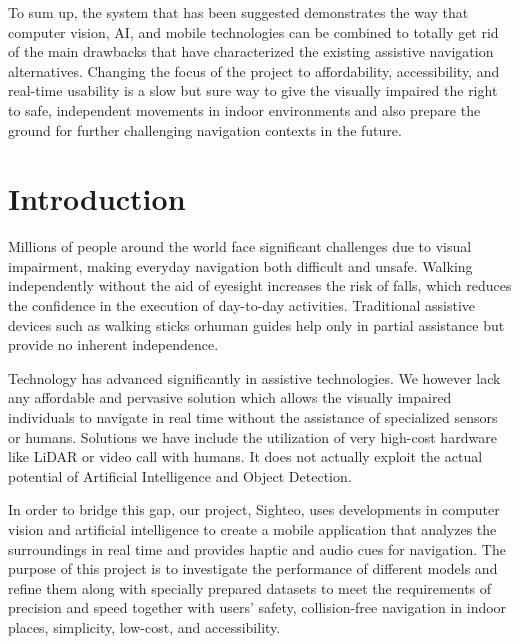 \documentclass{FastFyp}
\begin{document}
To sum up, the system that has been suggested demonstrates the way that computer vision, AI, and mobile technologies can be combined to totally get rid of the main drawbacks that have characterized the existing assistive navigation alternatives. Changing the focus of the project to affordability, accessibility, and real-time usability is a slow but sure way to give the visually impaired the right to safe, independent movements in indoor environments and also prepare the ground for further challenging navigation contexts in the future.


\pagebreak


\pagestyle{fancy} %
\tableofcontents

\pagebreak
\listoffigures	%
\pagebreak
\listoftables %

\mainmatter


\chapter{Introduction}
Millions of people around the world face significant challenges due to visual impairment, making everyday navigation both difficult and unsafe. Walking independently without the aid of eyesight increases the risk of falls, which reduces the confidence in the execution of day-to-day activities. Traditional assistive devices such as walking sticks orhuman guides help only in partial assistance but provide no inherent independence.  

Technology has advanced significantly in assistive technologies. We however lack any affordable and pervasive solution which allows the visually impaired individuals to navigate in real time without the assistance of specialized sensors or humans. Solutions we have include the utilization of very high-cost hardware like LiDAR or video call with humans. It does not actually exploit the actual potential of Artificial Intelligence and Object Detection.  

In order to bridge this gap, our project, Sighteo, uses developments in computer vision and artificial intelligence to create a mobile application that analyzes the surroundings in real time and provides haptic and audio cues for navigation. The purpose of this project is to investigate the performance of different models and refine them along with specially prepared datasets to meet the requirements of precision and speed together with users’ safety, collision-free navigation in indoor places, simplicity, low-cost, and accessibility.
\end{document}
